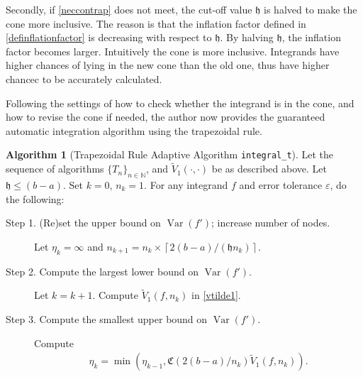 \documentclass{iitthesis}
\DeclareMathOperator{\Var}{Var}
\theoremstyle{definition}
\newtheorem{algo}{Algorithm}
\theoremstyle{remark}
\begin{document}
Secondly, if \eqref{neccontrap} does not meet, the cut-off value $\mathfrak{h}$ is halved to make the cone more inclusive. The reason is that the inflation factor defined in \eqref{definflationfactor} is decreasing with respect to $\mathfrak{h}$. By halving $\mathfrak{h}$, the inflation factor becomes larger. Intuitively the cone is more inclusive. Integrands have higher chances of lying in the new cone than the old one, thus have higher chancec to be accurately calculated.

Following the settings of how to check whether the integrand is in the cone, and how to revise the cone if needed, the author now provides the guaranteed automatic integration algorithm using the trapezoidal rule.
\begin{algo}[Trapezoidal Rule Adaptive Algorithm {\tt integral\_t}] \label{multistagetrapalgo}
Let the sequence of algorithms $\{T_n\}_{n\in \mathbb{N}}$, %
and $\widetilde{V}_1(\cdot,\cdot)$ be as described above.
Let $\mathfrak{h}\le (b-a)$. Set $k=0$, $n_{k}=1$. For any integrand $f$ and error tolerance $\varepsilon$, do the following: %
\begin{description}
\item[Step 1. (Re)set the upper bound on $\Var(f')$; increase number of nodes.] Let $\eta_{k}=\infty$ and $n_{k+1}=n_k\times\left\lceil2(b-a)/(\mathfrak{h}n_{k})\right\rceil$.

\item[Step 2. Compute the largest lower bound on {$\Var(f')$}.] Let $k=k+1$. Compute  $\widetilde{V}_1(f,n_k)$ in \eqref{vtilde1}.%

\item[Step 3. Compute the smallest upper bound on {$\Var(f')$}.] Compute
    \begin{align*}
        \eta_{k}=\min\left(\eta_{k-1},\mathfrak{C}(2(b-a)/n_{k})\widetilde{V}_1(f,n_k)\right).
    \end{align*}


\end{description}
\end{algo}
\end{document}
